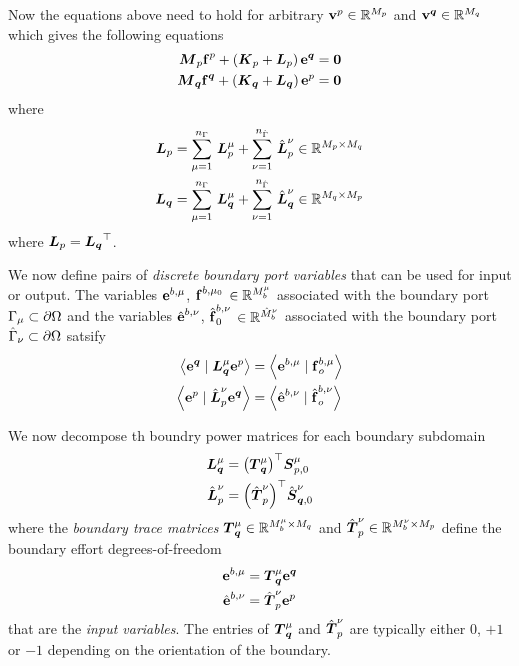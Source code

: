 Now the equations above need to hold for arbitrary
$\dcovectr{v}^{p}\in\rntopology{M_{p}}$ and
$\dcovectr{v}^{\covectr{q}}\in\rntopology{M_{q}}$ which gives the following
equations
\begin{align}
  \matr{M}_{p}\dcovectr{f}^{p}+\pbrac{\matr{K}_{p}+\matr{L}_{p}}\dcovectr{e}^{\covectr{q}}&=\vectr{0}\\
  \matr{M}_{\covectr{q}}\dcovectr{f}^{\covectr{q}}+\pbrac{\matr{K}_{\covectr{q}}+\matr{L}_{\covectr{q}}}\dcovectr{e}^{p}&=\vectr{0}
\end{align}
where
\begin{align}
  \matr{L}_{p}&=\gsum{\mu=1}{n_{\Gamma}}{\matr{L}^{\mu}_{p}}+\gsum{\nu=1}{n_{\hat{\Gamma}}}{\hat{\matr{L}}}^{\nu}_{p}\in\rntopology{M_{p}\times
  M_{q}}\\
  \matr{L}_{\covectr{q}}&=\gsum{\mu=1}{n_{\Gamma}}{\matr{L}^{\mu}_{\covectr{q}}}+\gsum{\nu=1}{n_{\hat{\Gamma}}}{\hat{\matr{L}}}^{\nu}_{\covectr{q}}\in\rntopology{M_{q}\times
  M_{p}}
\end{align}
where $\matr{L}_{p}=\transpose{\matr{L}_{\covectr{q}}}$.

We now define pairs of \emph{discrete boundary port variables} that can be used for input
or output. The variables $ \boldsymbol{\mathrm{e}} ^{b,\mu}$, $ \boldsymbol{\mathrm{f}} ^{b,\mu_{0}}$
$\in\rntopology{M^{\mu}_{b}}$ associated with the boundary port
$\Gamma_{\mu}\subset \partial{\Omega} $ and the variables
$\hat{ \boldsymbol{\mathrm{e}} }^{b,\nu}$, $\hat{ \boldsymbol{\mathrm{f}} }^{b,\nu}_{0}$
$\in\rntopology{\hat{M}^{\nu}_{b}}$ associated with the boundary port
$\hat{\Gamma}_{\nu}\subset \partial{\Omega} $ satsify
\begin{align}
  \dualityform{\dcovectr{e}^{\covectr{q}}}{\matr{L}^{\mu}_{\covectr{q}}\dcovectr{e}^{p}}{}&=\dualityform{\dcovectr{e}^{b,\mu}}{\dcovectr{f}^{b,\mu}_{o}}{}\\
  \dualityform{\dcovectr{e}^{p}}{\hat{\matr{L}}^{\nu}_{p}\dcovectr{e}^{\covectr{q}}}{}&=\dualityform{\hat{\dcovectr{e}}^{b,\nu}}{\hat{\dcovectr{f}}^{b,\nu}_{o}}{}    
\end{align}

We now decompose th boundry power matrices for each boundary subdomain \ie
\begin{align}
  \matr{L}^{\mu}_{\covectr{q}}&=\transpose{\pbrac{\matr{T}^{\mu}_{\covectr{q}}}}\matr{S}^{\mu}_{p,0}\\
  \hat{\matr{L}}^{\nu}_{p}&=\transpose{\pbrac{\hat{\matr{T}}^{\nu}_{p}}}\hat{\matr{S}}^{\nu}_{\covectr{q},0}
\end{align}
where the \emph{boundary trace matrices}
$\matr{T}^{\mu}_{\covectr{q}}\in\rntopology{M^{\mu}_{b}\times M_{q}}$ and
$\hat{\matr{T}}^{\nu}_{p}\in\rntopology{M^{\nu}_{b}\times M_{p}}$ define the
boundary effort degrees-of-freedom \ie
\begin{align}
  \dcovectr{e}^{b,\mu}&=\matr{T}^{\mu}_{\covectr{q}}\dcovectr{e}^{\covectr{q}}\\
  \hat{\dcovectr{e}}^{b,\nu}&=\hat{\matr{T}}^{\nu}_{p}\dcovectr{e}^{p} 
\end{align}
that are the \emph{input variables}. The entries of $\matr{T}^{\mu}_{\covectr{q}}$
and $\hat{\matr{T}}^{\nu}_{p}$ are typically either $0$, $+1$ or $-1$
depending on the orientation of the boundary.

